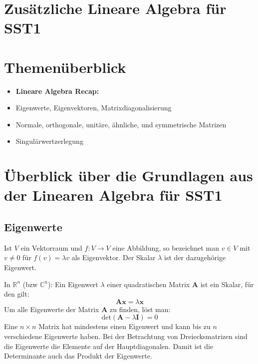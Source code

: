 \documentclass[11pt]{article}
\renewcommand{\thesection}{\arabic{section}}
\begin{document}
\thispagestyle{firstpage}

\setlength{\headheight}{1 \baselineskip}  %
\setlength{\parindent}{0pt}  %
\setlength{\parskip}{\baselineskip}  %

\vspace*{-5px}
\section*{Zusätzliche Lineare Algebra für SST1}

\section*{Themenüberblick}
\begin{itemize}
    \item \textbf{Lineare Algebra Recap:}
    \item[] Eigenwerte, Eigenvektoren, Matrixdiagonalisierung
    \item[] Normale, orthogonale, unitäre, ähnliche, und symmetrische Matrizen
    \item[] Singulärwertzerlegung
\end{itemize}

\vfill \null
\pagebreak



\setcounter{section}{1}
\renewcommand{\thesection}{1} %

\section*{Überblick über die Grundlagen aus der Linearen Algebra für SST1}
\vspace*{-0.5cm}
\subsection*{Eigenwerte}
\vspace*{-0.5cm}
Ist $V$ ein Vektorraum und $f:V \to V$ eine Abbildung, so bezeichnet man  $v \in V$ mit $v \neq 0$ für $f(v) = \lambda v$ als Eigenvektor. Der Skalar $\lambda$ ist der dazugehörige Eigenwert.

In $\mathbb{R}^n$ (bzw $\mathbb{C}^n$): Ein Eigenwert $\lambda$ einer quadratischen Matrix $\mathbf{A}$ ist ein Skalar, für den gilt:
$$\mathbf{Ax} = \lambda \mathbf{x}$$
Um alle Eigenwerte der Matrix $\mathbf{A}$ zu finden, löst man:
$$\text{det}(\mathbf{A}-\lambda \mathbf{I}) = 0$$
Eine $n \times n$ Matrix hat mindestens einen Eigenwert und kann bis zu $n$ verschiedene Eigenwerte haben. Bei der Betrachtung von Dreiecksmatrizen sind die Eigenwerte die Elemente auf der Hauptdiagonalen. Damit ist die Determinante auch das Produkt der Eigenwerte.
\end{document}
